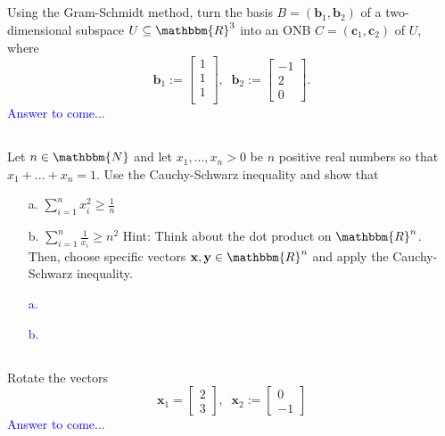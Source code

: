 \documentclass[a4paper,12pt]{article}
\newcommand{\R}{\mathbbm{R}}
\newcommand{\N}{\mathbbm{N}}
\newcommand{\M}[1]{ \begin{bmatrix} #1 \end{bmatrix} }
\newcommand{\vecx}{\textbf{x}}
\newcommand{\vecy}{\textbf{y}}
\newcommand{\vecb}{\textbf{b}}
\newcommand{\vecc}{\textbf{c}}
\newcommand{\stsum}{\sum_{i=1}^n}
\begin{document}
\subsection{}
Using the Gram-Schmidt method, turn the basis $B = (\vecb_1, \vecb_2)$ of a two-dimensional subspace $U \subseteq \R^3$ into an ONB $C = (\vecc_1, \vecc_2)$ of $U$, where
$$\vecb_1 := \M{1\\1\\1\\}, \;\; \vecb_2 := \M{-1\\2\\0}.$$
\textcolor{blue}{
Answer to come...
}
\subsection{}
Let $n \in \N$ and let $x_1, ... , x_n > 0$ be $n$ positive real numbers so that $x_1+...+x_n=1$. Use the Cauchy-Schwarz inequality and show that
\begin{itemize}
 \item [a.] $\stsum x_i^2 \geq \frac{1}{n}$
 \item [b.] $\stsum \frac{1}{x_i} \geq n^2$
 Hint: Think about the dot product on $\R^n$. Then, choose specific vectors $\vecx, \vecy \in \R^n$ and apply the Cauchy-Schwarz inequality.
\end{itemize}
\textcolor{blue}{
\begin{itemize}
 \item [a.]
 \item [b.]
\end{itemize}
}
\subsection{}
Rotate the vectors
$$\vecx_1 = \M{2\\3}, \;\; \vecx_2 := \M{0\\-1}$$
\textcolor{blue}{
Answer to come...
}
\newpage%
\end{document}
